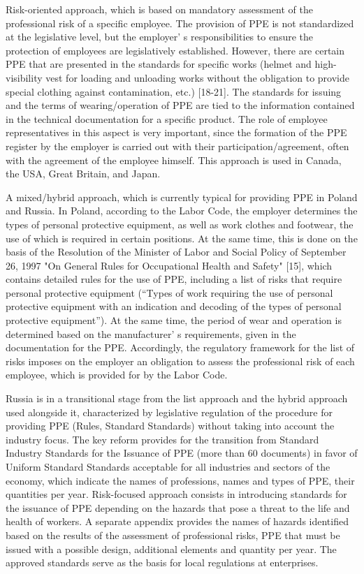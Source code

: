 \begin{multicols}{2}
Risk-oriented approach, which is based on mandatory assessment of the
professional risk of a specific employee. The provision of PPE is not
standardized at the legislative level, but the
employer' s responsibilities to ensure the protection of
employees are legislatively established. However, there are certain PPE
that are presented in the standards for specific works (helmet and
high-visibility vest for loading and unloading works without the
obligation to provide special clothing against contamination, etc.)
{[}18-21{]}. The standards for issuing and the terms of
wearing/operation of PPE are tied to the information contained in the
technical documentation for a specific product. The role of employee
representatives in this aspect is very important, since the formation of
the PPE register by the employer is carried out with their
participation/agreement, often with the agreement of the employee
himself. This approach is used in Canada, the USA, Great Britain, and
Japan.

A mixed/hybrid approach, which is currently typical for providing PPE in
Poland and Russia. In Poland, according to the Labor Code, the employer
determines the types of personal protective equipment, as well as work
clothes and footwear, the use of which is required in certain positions.
At the same time, this is done on the basis of the Resolution of the
Minister of Labor and Social Policy of September 26, 1997 "On General
Rules for Occupational Health and Safety" {[}15{]}, which contains
detailed rules for the use of PPE, including a list of risks that
require personal protective equipment (``Types of work requiring the use
of personal protective equipment with an indication and decoding of the
types of personal protective equipment''). At the same time, the period
of wear and operation is determined based on the
manufacturer' s requirements, given in the documentation
for the PPE. Accordingly, the regulatory framework for the list of risks
imposes on the employer an obligation to assess the professional risk of
each employee, which is provided for by the Labor Code.

Russia is in a transitional stage from the list approach and the hybrid
approach used alongside it, characterized by legislative regulation of
the procedure for providing PPE (Rules, Standard Standards) without
taking into account the industry focus. The key reform provides for the
transition from Standard Industry Standards for the Issuance of PPE
(more than 60 documents) in favor of Uniform Standard Standards
acceptable for all industries and sectors of the economy, which indicate
the names of professions, names and types of PPE, their quantities per
year. Risk-focused approach consists in introducing standards for the
issuance of PPE depending on the hazards that pose a threat to the life
and health of workers. A separate appendix provides the names of hazards
identified based on the results of the assessment of professional risks,
PPE that must be issued with a possible design, additional elements and
quantity per year. The approved standards serve as the basis for local
regulations at enterprises.


\end{multicols}
